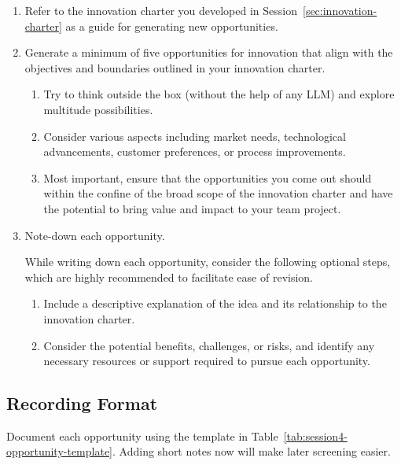 \begin{enumerate}
    \item Refer to the innovation charter you developed in Session~\ref{sec:innovation-charter} as a guide for generating new opportunities.
    \item Generate a minimum of five opportunities for innovation that align with the objectives and boundaries outlined in your innovation charter.
    \begin{enumerate}
        \item Try to think outside the box (without the help of any LLM) and explore multitude possibilities.
        \item Consider various aspects including market needs, technological advancements, customer preferences, or process improvements.
        \item Most important, ensure that the opportunities you come out should within the confine of the broad scope of the innovation charter and have the potential to bring value and impact to your team project.
    \end{enumerate}
    \item Note-down each opportunity.

    While writing down each opportunity, consider the following optional steps, which are highly recommended to facilitate ease of revision.
    \begin{enumerate}
        \item Include a descriptive explanation of the idea and its relationship to the innovation charter.
        \item Consider the potential benefits, challenges, or risks, and identify any necessary resources or support required to pursue each opportunity.
    \end{enumerate}
\end{enumerate}

\subsection{Recording Format}

Document each opportunity using the template in Table~\ref{tab:session4-opportunity-template}. Adding short notes now will make later screening easier.

